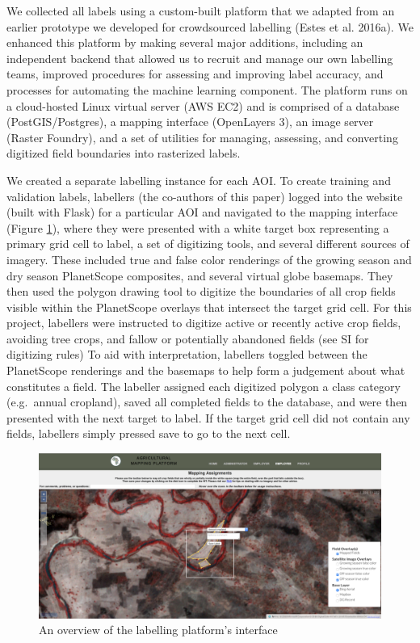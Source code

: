 \documentclass[11pt,a4paper]{article}
\begin{document}
We collected all labels using a custom-built platform that we adapted
from an earlier prototype we developed for crowdsourced labelling (Estes
et al. 2016a). We enhanced this platform by making several major
additions, including an independent backend that allowed us to recruit
and manage our own labelling teams, improved procedures for assessing
and improving label accuracy, and processes for automating the machine
learning component. The platform runs on a cloud-hosted Linux virtual
server (AWS EC2) and is comprised of a database (PostGIS/Postgres), a
mapping interface (OpenLayers 3), an image server (Raster Foundry), and
a set of utilities for managing, assessing, and converting digitized
field boundaries into rasterized labels.

We created a separate labelling instance for each AOI. To create
training and validation labels, labellers (the co-authors of this paper)
logged into the website (built with Flask) for a particular AOI and
navigated to the mapping interface (Figure \ref{fig:labeller}), where
they were presented with a white target box representing a primary grid
cell to label, a set of digitizing tools, and several different sources
of imagery. These included true and false color renderings of the
growing season and dry season PlanetScope composites, and several
virtual globe basemaps. They then used the polygon drawing tool to
digitize the boundaries of all crop fields visible within the
PlanetScope overlays that intersect the target grid cell. For this
project, labellers were instructed to digitize active or recently active
crop fields, avoiding tree crops, and fallow or potentially abandoned
fields (see SI for digitizing rules) To aid with interpretation,
labellers toggled between the PlanetScope renderings and the basemaps to
help form a judgement about what constitutes a field. The labeller
assigned each digitized polygon a class category (e.g.~annual cropland),
saved all completed fields to the database, and were then presented with
the next target to label. If the target grid cell did not contain any
fields, labellers simply pressed save to go to the next cell.

\begin{figure}

{\centering \includegraphics[width=0.95\linewidth]{figures/figure2} 

}

\caption{An overview of the labelling platform's interface}\label{fig:labeller}
\end{figure}
\end{document}
